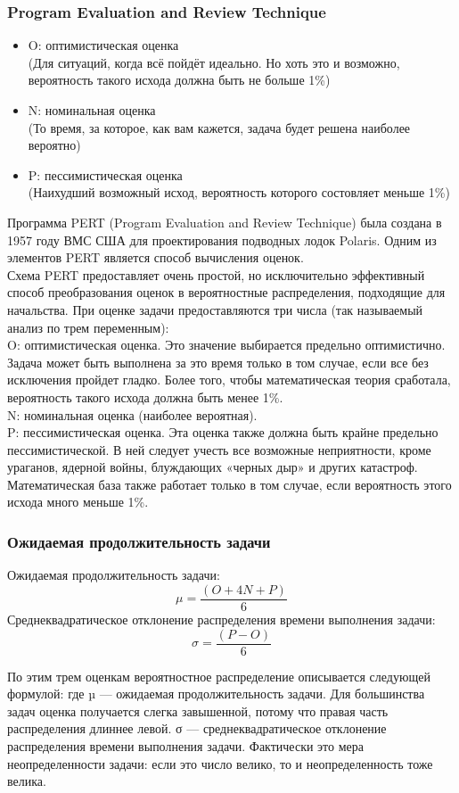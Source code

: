 \documentclass{../industrial-development}
\begin{document}
\begin{frame} \frametitle{Program Evaluation and Review Technique}
\begin{itemize}
  \item O: оптимистическая оценка\\
	(Для ситуаций, когда всё пойдёт идеально. Но хоть это и возможно, вероятность такого исхода должна быть не больше 1\%)
	\item N: номинальная оценка\\
	(То время, за которое, как вам кажется, задача будет решена наиболее вероятно)
	\item P: пессимистическая оценка\\
	(Наихудший возможный исход, вероятность которого состовляет меньше 1\%)
\end{itemize}
\end{frame}
\lecturenotes
Программа PERT (Program Evaluation and Review Technique) была создана в 1957 году ВМС США для проектирования подводных лодок Polaris. Одним из элементов PERT является способ вычисления оценок.\\
Схема PERT предоставляет очень простой, но исключительно эффективный способ преобразования оценок в вероятностные распределения, подходящие для начальства. При оценке задачи предоставляются три числа (так называемый анализ по трем переменным):\\
O: оптимистическая оценка. Это значение выбирается предельно оптимистично. Задача может быть выполнена за это время только в том случае, если все без исключения пройдет гладко. Более того, чтобы математическая теория сработала, вероятность такого исхода должна быть менее 1\%.\\
N: номинальная оценка (наиболее вероятная).\\
P: пессимистическая оценка. Эта оценка также должна быть крайне предельно пессимистической. В ней следует учесть все возможные неприятности, кроме ураганов, ядерной войны, блуждающих «черных дыр» и других катастроф. Математическая база также работает
только в том случае, если вероятность этого исхода много меньше 1\%.

\begin{frame} \frametitle{Ожидаемая продолжительность задачи}
	Ожидаемая продолжительность задачи:
	\[\mu = \frac{(O + 4N + P)}6\]
	Среднеквадратическое отклонение распределения времени выполнения задачи:
	\[\sigma = \frac{(P-O)}6\]
\end{frame}
\lecturenotes
По этим трем оценкам вероятностное распределение описывается следующей формулой: где µ — ожидаемая продолжительность задачи. Для большинства задач оценка получается слегка завышенной, потому что правая часть распределения длиннее левой.
σ — среднеквадратическое отклонение распределения времени выполнения задачи. Фактически это мера неопределенности задачи: если
это число велико, то и неопределенность тоже велика. 
\end{document}
